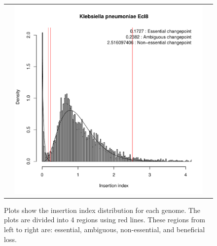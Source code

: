 \documentclass[12pt,letterpaper]{article}
\begin{document}
\begin{figure}
\begin{tabular}{c c c}
&\includegraphics[page=13, scale=0.25]{essentiality.pdf}&\\
\end{tabular}
\caption{Plots show the insertion index distribution for each genome. The plots are divided into 4 regions using red lines. These regions from left to right are: essential, ambiguous, non-essential, and beneficial loss.}
\label{fig:iidist-species}
\end{figure}
%
%




\end{document}

